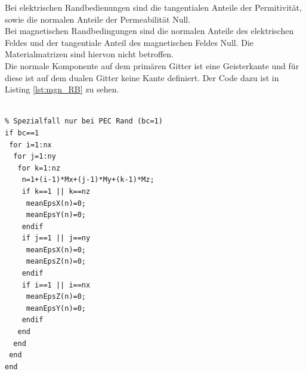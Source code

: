 \documentclass[Protokollheft.tex]{subfiles}
\begin{document}
Bei elektrischen Randbedienungen sind die tangentialen Anteile der Permitivität, sowie die normalen Anteile der Permeabilität Null.\\
Bei magnetischen Randbedingungen sind die normalen Anteile des elektrischen Feldes und der tangentiale Anteil des magnetischen Feldes Null. 
Die Materialmatrizen sind hiervon nicht betroffen. \\
Die normale Komponente auf dem primären Gitter ist eine Geisterkante und für diese ist auf dem dualen Gitter keine Kante definiert. Der Code dazu ist in Listing \ref{lst:mgn_RB} zu sehen.
\begin{lstlisting}[caption={Einsetzten der elektrischen Randbedigungen},label={lst:mgn_RB}]
%% Randbedingungen

% Spezialfall nur bei PEC Rand (bc=1)
if bc==1
 for i=1:nx
  for j=1:ny
   for k=1:nz
    n=1+(i-1)*Mx+(j-1)*My+(k-1)*Mz;
    if k==1 || k==nz
     meanEpsX(n)=0; 
     meanEpsY(n)=0;
    endif
    if j==1 || j==ny
     meanEpsX(n)=0; 
     meanEpsZ(n)=0;
    endif
    if i==1 || i==nx
     meanEpsZ(n)=0; 
     meanEpsY(n)=0;
    endif
   end
  end
 end
end
\end{lstlisting}
\end{document}

